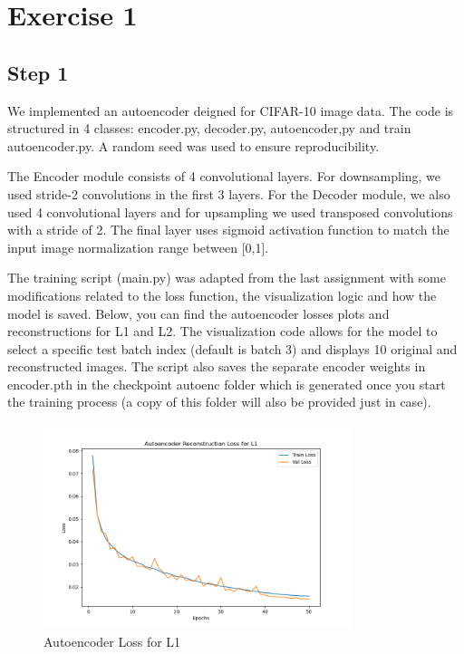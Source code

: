 

\section{Exercise 1}
\subsection{Step 1}

We implemented an autoencoder deigned for CIFAR-10 image data. The code is structured in 4 classes: encoder.py, decoder.py, autoencoder,py and train autoencoder.py. A random seed was used to ensure reproducibility.

The Encoder module consists of 4 convolutional layers. For downsampling, we used stride-2 convolutions in the first 3 layers. For the Decoder module, we also used 4 convolutional layers and for upsampling we used transposed convolutions with a stride of 2. The final layer uses sigmoid activation function to match the input image normalization range between [0,1].

The training script (main.py) was adapted from the last assignment with some modifications related to the loss function, the visualization logic and how the model is saved. Below, you can find the autoencoder losses plots and reconstructions for L1 and L2. The visualization code allows for the model to select a specific test batch index (default is batch 3) and displays 10 original and reconstructed images. The script also saves the separate encoder weights in encoder.pth in the checkpoint autoenc folder which is generated once you start the training process (a copy of this folder will also be provided just in case).

\begin{figure}[H] 
    \centering
    \includegraphics[width=0.8\textwidth]{assignment_2/report/images/ex1_autoencoder_loss_l1.png} 
    \caption{Autoencoder Loss for L1}
\end{figure}

